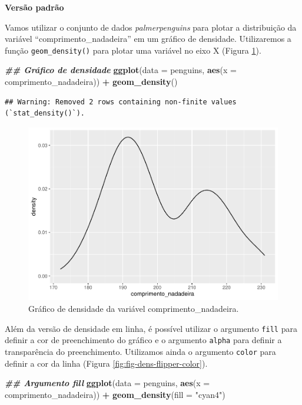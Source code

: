 \documentclass[
]{article}
\newenvironment{Shaded}{\begin{snugshade}}{\end{snugshade}}
\newcommand{\AttributeTok}[1]{\textcolor[rgb]{0.13,0.29,0.53}{#1}}
\newcommand{\DocumentationTok}[1]{\textcolor[rgb]{0.56,0.35,0.01}{\textbf{\textit{#1}}}}
\newcommand{\FunctionTok}[1]{\textcolor[rgb]{0.13,0.29,0.53}{\textbf{#1}}}
\newcommand{\NormalTok}[1]{#1}
\newcommand{\SpecialCharTok}[1]{\textcolor[rgb]{0.81,0.36,0.00}{\textbf{#1}}}
\newcommand{\StringTok}[1]{\textcolor[rgb]{0.31,0.60,0.02}{#1}}
\begin{document}
\textbf{Versão padrão}

Vamos utilizar o conjunto de dados \emph{palmerpenguins} para plotar a distribuição da variável ``comprimento\_nadadeira'' em um gráfico de densidade. Utilizaremos a função \texttt{geom\_density()} para plotar uma variável no eixo X (Figura \ref{fig:fig-dens-flipper}).

\begin{Shaded}
\begin{Highlighting}[]
\DocumentationTok{\#\# Gráfico de densidade}
\FunctionTok{ggplot}\NormalTok{(}\AttributeTok{data =}\NormalTok{ penguins, }\FunctionTok{aes}\NormalTok{(}\AttributeTok{x =}\NormalTok{ comprimento\_nadadeira)) }\SpecialCharTok{+}
    \FunctionTok{geom\_density}\NormalTok{()}
\end{Highlighting}
\end{Shaded}

\begin{verbatim}
## Warning: Removed 2 rows containing non-finite values (`stat_density()`).
\end{verbatim}

\begin{figure}
\includegraphics[width=0.75\linewidth,height=0.75\textheight]{epr_files/figure-latex/fig-dens-flipper-1} \caption{Gráfico de densidade da variável comprimento_nadadeira.}\label{fig:fig-dens-flipper}
\end{figure}

Além da versão de densidade em linha, é possível utilizar o argumento \texttt{fill} para definir a cor de preenchimento do gráfico e o argumento \texttt{alpha} para definir a transparência do preenchimento. Utilizamos ainda o argumento \texttt{color} para definir a cor da linha (Figura \ref{fig:fig-dens-flipper-color}).

\begin{Shaded}
\begin{Highlighting}[]
\DocumentationTok{\#\# Argumento fill}
\FunctionTok{ggplot}\NormalTok{(}\AttributeTok{data =}\NormalTok{ penguins, }\FunctionTok{aes}\NormalTok{(}\AttributeTok{x =}\NormalTok{ comprimento\_nadadeira)) }\SpecialCharTok{+}
    \FunctionTok{geom\_density}\NormalTok{(}\AttributeTok{fill =} \StringTok{"cyan4"}\NormalTok{)}
\end{Highlighting}
\end{Shaded}
\end{document}
